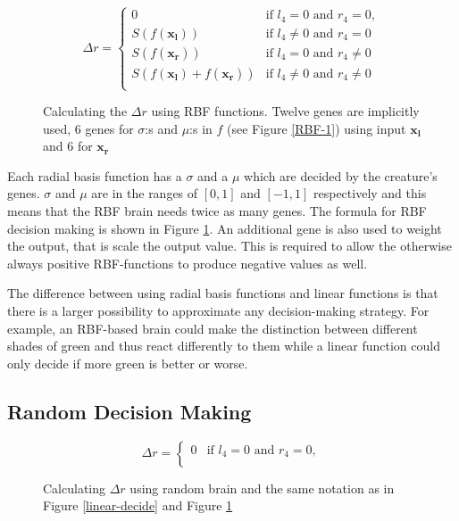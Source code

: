 \documentclass[a4paper,11pt]{kth-mag}
\begin{document}
\begin{figure}
\begin{equation}
\Delta r =
\begin{cases}
	0 										&	\text{if $l_4 = 0$ and $r_4 = 0$},\\
	S(f(\mathbf{x_l})) 						&	\text{if $l_4 \neq 0$ and $r_4 = 0$}\\
	S(f(\mathbf{x_r})) 						&	\text{if $l_4 = 0$ and $r_4 \neq 0$}\\
	S(f(\mathbf{x_l}) + f(\mathbf{x_r})) 	&	\text{if $l_4 \neq 0$ and $r_4 \neq 0$}\\
\end{cases}	
\end{equation}
\caption{Calculating the $\Delta r$ using RBF functions. Twelve genes are implicitly used, 6 genes for $\sigma$:s and $\mu$:s in $f$ (see Figure \ref{RBF-1}) using input $\mathbf{x_l}$ and 6 for $\mathbf{x_r}$ }
\label{RBF-decide}
	\end{figure}

Each radial basis function has a $\sigma$ and a $\mu$ which are decided by the creature's genes. $\sigma$ and $\mu$ are in the ranges of $[0,1]$ and $[-1,1]$ respectively and this means that the RBF brain needs twice as many genes. The formula for RBF decision making is shown in Figure \ref{RBF-decide}. An additional gene is also used to weight the output, that is scale the output value. This is required to allow the otherwise always positive RBF-functions to produce negative values as well.

The difference between using radial basis functions and linear functions is that there is a larger possibility to approximate any decision-making strategy. For example, an RBF-based brain could make the distinction between different shades of green and thus react differently to them while a linear function could only decide if more green is better or worse.

\subsection{Random Decision Making}

\begin{figure}
\begin{equation}
\Delta r = 
\begin{cases}
	0 		& 	\text{if $l_4 = 0$ and $r_4 = 0$},\\
\end{cases}
\end{equation}
\caption{Calculating $\Delta r$ using random brain and the same notation as in Figure \ref{linear-decide} and Figure \ref{RBF-decide}} 
\label{random-decide}
\end{figure}
\end{document}

